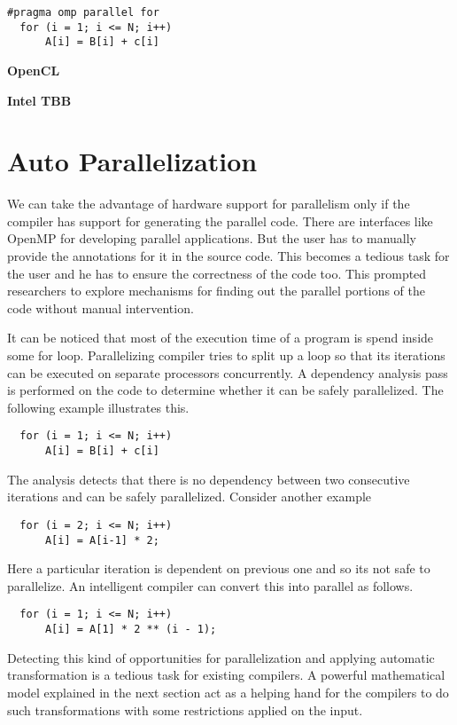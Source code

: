 \documentclass[a4paper,12pt]{book}
\begin{document}
{\footnotesize
\begin{lstlisting}
#pragma omp parallel for
  for (i = 1; i <= N; i++)
      A[i] = B[i] + c[i]
\end{lstlisting}
}

\textbf{OpenCL}

\textbf{Intel TBB}

\section{Auto Parallelization}
We can take the advantage of hardware support for parallelism only if the compiler has
support for generating the parallel code. There are interfaces like OpenMP for
developing parallel applications. But the user has to manually provide the annotations
for it in the source code. This becomes a tedious task for the user and he has to
ensure the correctness of the code too. This prompted researchers to explore
mechanisms for finding out the parallel portions of the code without manual intervention.

It can be noticed that most of the execution time of a program is spend inside some
for loop. Parallelizing compiler tries to split up a loop so that its iterations can
be executed on separate processors concurrently. A dependency analysis pass is 
performed on the code to determine whether it can be safely parallelized. The following
example illustrates this.

{\footnotesize
\begin{lstlisting}
  for (i = 1; i <= N; i++)
      A[i] = B[i] + c[i]
\end{lstlisting}
}

The analysis detects that there is no dependency between two consecutive iterations and
can be safely parallelized. Consider another example

{\footnotesize
\begin{lstlisting}
  for (i = 2; i <= N; i++)
      A[i] = A[i-1] * 2;
\end{lstlisting}
}

Here a particular iteration is dependent on previous one and so its not safe to parallelize.
An intelligent compiler can convert this into parallel as follows.

{\footnotesize
\begin{lstlisting}
  for (i = 1; i <= N; i++)
      A[i] = A[1] * 2 ** (i - 1);
\end{lstlisting}
}

Detecting this kind of opportunities for parallelization and applying automatic transformation
is a tedious task for existing compilers. A powerful mathematical model explained in the next
section act as a helping hand for the compilers to do such transformations with some
restrictions applied on the input.
\end{document}
